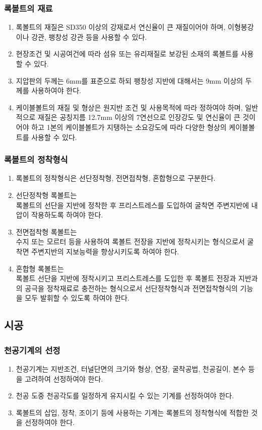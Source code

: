 \documentclass[12pt,a4paper]{article}
\begin{document}
\subsubsection{록볼트의 재료}
\begin{enumerate}
\item  록볼트의 재질은 SD350 이상의 강재로서 연신율이 큰 재질이어야 하며, 이형봉강이나 강관, 팽창성 강관 등을 사용할 수 있다.  
\item  현장조건 및 시공여건에 따라 섬유 또는 유리재질로 보강된 소재의 록볼트를 사용할 수 있다.  
\item  지압판의 두께는 6mm를 표준으로 하되 팽창성 지반에 대해서는 9mm 이상의 두께를 사용하여야 한다.  
\item  케이블볼트의 재질 및 형상은 원지반 조건 및 사용목적에 따라 정하여야 하며, 
       일반적으로 재질은 공칭지름 12.7mm 이상의 7연선으로 인장강도 및 연신율이 큰 것이어야 하고 
       1본의 케이블볼트가 지탱하는 소요강도에 따라 다양한 형상의 케이블볼트를 사용할 수 있다.  
\end{enumerate}

\subsubsection{록볼트의 정착형식}
\begin{enumerate}
\item  록볼트의 정착형식은 선단정착형, 전면접착형, 혼합형으로 구분한다.  
\item  선단정착형 록볼트는 \\ 록볼트의 선단을 지반에 정착한 후 프리스트레스를 도입하여 굴착면 주변지반에 내압이 작용하도록 하여야 한다.  
\item  전면접착형 록볼트는 \\ 수지 또는 모르터 등을 사용하여 록볼트 전장을 지반에 정착시키는 형식으로서 
       굴착면 주변지반의 지보능력을 향상시키도록 하여야 한다.  
\item  혼합형 록볼트는 \\ 록볼트 선단을 지반에 정착시키고 프리스트레스를 도입한 후 록볼트 전장과 지반과의 공극을 
       정착재료로 충전하는 형식으로서 선단정착형식과 전면접착형식의 기능을 모두 발휘할 수 있도록 하여야 한다.  
\end{enumerate}

\subsection{시공}

\subsubsection{천공기계의 선정}
\begin{enumerate}
\item  천공기계는 지반조건, 터널단면의 크기와 형상, 연장, 굴착공법, 천공길이, 본수 등을 고려하여 선정하여야 한다.  
\item  천공 도중 천공각도를 일정하게 유지시킬 수 있는 기계를 선정하여야 한다.  
\item  록볼트의 삽입, 정착, 조이기 등에 사용하는 기계는 록볼트의 정착형식에 적합한 것을 선정하여야 한다.  
\end{enumerate}
\end{document}
